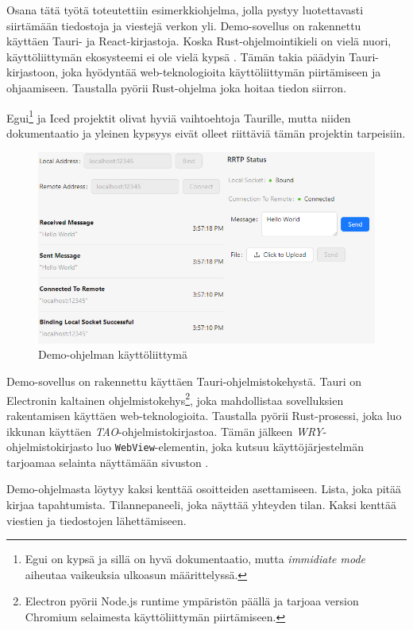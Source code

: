 \documentclass[a4paper,12pt]{article}
\begin{document}
    Osana tätä työtä toteutettiin esimerkkiohjelma, jolla pystyy luotettavasti siirtämään tiedostoja ja viestejä verkon yli. Demo-sovellus on rakennettu käyttäen Tauri- ja React-kirjastoja. Koska Rust-ohjelmointikieli on vielä nuori, käyttöliittymän ekosysteemi ei ole vielä kypsä \cite{AreYet}. Tämän takia päädyin Tauri-kirjastoon, joka hyödyntää web-teknologioita käyttöliittymän piirtämiseen ja ohjaamiseen. Taustalla pyörii Rust-ohjelma joka hoitaa tiedon siirron. \par
    Egui\footnote{Egui on kypsä ja sillä on hyvä dokumentaatio, mutta \textit{immidiate mode} aiheutaa vaikeuksia ulkoasun määrittelyssä. } ja Iced projektit olivat hyviä vaihtoehtoja Taurille, mutta niiden dokumentaatio ja yleinen kypsyys eivät olleet riittäviä tämän projektin tarpeisiin. \par

    \begin{figure}[h!]
        \centering
        \includegraphics[width=\textwidth]{doc/latex/src/images/RRTP.png}
        \caption{Demo-ohjelman käyttöliittymä}
        \label{fig:demo_interface}
    \end{figure}

    Demo-sovellus on rakennettu käyttäen Tauri-ohjelmistokehystä.
    Tauri on Electronin kaltainen ohjelmistokehys\footnote{Electron pyörii Node.js runtime ympäristön päällä ja tarjoaa version Chromium selaimesta käyttöliittymän piirtämiseen.}, joka mahdollistaa sovelluksien rakentamisen käyttäen web-teknologioita. Taustalla pyörii Rust-prosessi, joka luo ikkunan käyttäen \textit{TAO}-ohjelmistokirjastoa. Tämän jälkeen \textit{WRY}-ohjelmistokirjasto luo \lstinline{WebView}-elementin, joka kutsuu käyttöjärjestelmän tarjoamaa selainta näyttämään sivuston \cite{tauri-app}.

    Demo-ohjelmasta löytyy kaksi kenttää osoitteiden asettamiseen. Lista, joka
    pitää kirjaa tapahtumista. Tilannepaneeli, joka näyttää yhteyden tilan.
    Kaksi kenttää viestien ja tiedostojen lähettämiseen. \par
\end{document}
